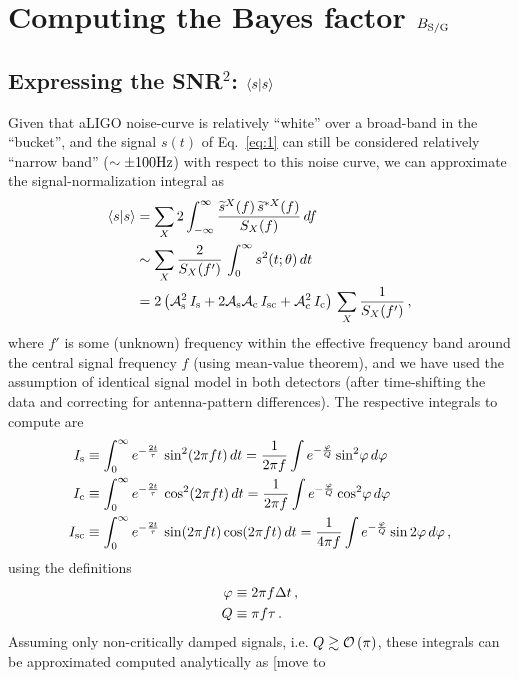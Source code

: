 \documentclass[aps,prd,onecolumn,nofootinbib,superscriptaddress,altaffilletter,floatfix]{revtex4-1}
\begin{document}
\section{Computing the Bayes factor $B_{\mathrm{S/G}}$}
\label{sec:comp-bayes-fact}


\subsection{Expressing the SNR$^2$: $\langle s|s\rangle$}
\label{sec:computing-scalarss}
Given that aLIGO noise-curve is relatively ``white'' over a broad-band in the ``bucket'', and the signal $s(t)$ of Eq.~\eqref{eq:1} can still be
considered relatively ``narrow band'' ($\sim \pm 100\mathrm{Hz}$) with respect to this noise curve, we can approximate the signal-normalization integral as
\begin{align}
  \label{eq:17}
  \langle s|s\rangle &= \sum_X 2 \int_{-\infty}^{\infty} \frac{\widetilde{s}^X(f)\,\widetilde{s}^{*X}(f)}{S_X(f)}\,d f\\
  &\sim \sum_X \frac{2}{S_X(f')} \, \int_{0}^{\infty} s^2(t;\theta)\,dt\\
  &= 2\left( \mathcal{A}_{\mathrm{s}}^2\,I_{\mathrm{s}} + 2\mathcal{A}_{\mathrm{s}}\mathcal{A}_{\mathrm{c}}\,I_{\mathrm{sc}} + \mathcal{A}_{\mathrm{c}}^2\,I_{\mathrm{c}} \right)\, \sum_X \frac{1}{S_X(f')}\,,
\end{align}
where $f'$ is some (unknown) frequency within the effective frequency band around the central signal frequency $f$ (using mean-value theorem), and we
have used the assumption of identical signal model in both detectors (after time-shifting the data and correcting for antenna-pattern differences).
The respective integrals to compute are
\begin{align}
  \label{eq:18}
  I_{\mathrm{s}} &\equiv \int_0^\infty e^{-\frac{2t}{\tau}}\,\sin^2(2\pi f t)\,dt = \frac{1}{2\pi f}\int e^{-\frac{\varphi}{Q}} \sin^2\!\varphi\,d\varphi\\
  I_{\mathrm{c}} &\equiv \int_0^\infty e^{-\frac{2t}{\tau}}\,\cos^2(2\pi f t)\,dt = \frac{1}{2\pi f}\int e^{-\frac{\varphi}{Q}} \cos^2\!\varphi\,d\varphi\\
  I_{\mathrm{sc}} &\equiv \int_0^\infty e^{-\frac{2t}{\tau}}\,\sin(2\pi f t)\cos(2\pi f t)\,dt = \frac{1}{4\pi f}\int e^{-\frac{\varphi}{Q}} \sin2\varphi\,d\varphi\,,
\end{align}
using the definitions
\begin{align}
  \label{eq:3}
  \varphi &\equiv 2\pi f \Delta t\,,\\
  Q       &\equiv \pi f \tau\,.
\end{align}
Assuming only non-critically damped signals, i.e. $Q\gtrsim \mathcal{O}\left(\pi\right)$, these integrals can be approximated computed analytically as [move to
\end{document}
